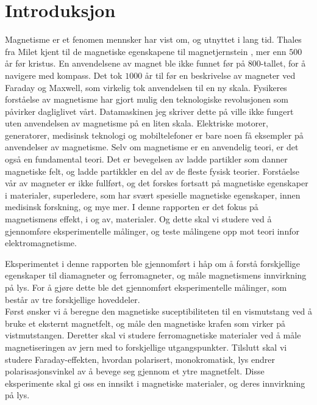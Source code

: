 \documentclass[%
 reprint,
 amsmath,amssymb,
 aps,
 norsk,
]{revtex4-1}
\begin{document}
\section{\label{sec:level1}Introduksjon}
Magnetisme er et fenomen mennsker har vist om, og utnyttet i lang tid. Thales fra Milet kjent til de magnetiske egenskapene til magnetjernstein \cite{holtebekk_magnetisme_2017}, mer enn $500$ år før kristus. En anvendelsene av magnet ble ikke funnet før på $800$-tallet, for å navigere med kompass. Det tok  $1000$ år til før en beskrivelse av magneter ved Faraday og Maxwell, som virkelig tok anvendelsen til en ny skala. Fysikeres forståelse av magnetisme har gjort mulig den teknologiske revolusjonen som påvirker dagliglivet vårt. Datamaskinen jeg skriver dette på ville ikke fungert uten anvendelsen av magnetisme på en liten skala. Elektriske motorer, generatorer, medisinsk teknologi og mobiltelefoner er bare noen få eksempler på anvendelser av magnetisme. Selv om magnetisme er en anvendelig teori, er det også en fundamental teori. Det er bevegelsen av ladde partikler som danner magnetiske felt, og ladde partikkler en del av de fleste fysisk teorier. Forståelse vår av magneter er ikke fullført, og det forskes fortsatt på magnetiske egenskaper i materialer, superledere, som har svært spesielle magnetiske egenskaper, innen medisinsk forskning, og mye mer.
I denne rapporten er det fokus på magnetismens effekt, i og av, materialer. Og dette skal vi studere ved å gjennomføre eksperimentelle målinger, og teste målingene opp mot teori innfor elektromagnetisme.\par
Eksperimentet i denne rapporten ble gjennomført i håp om å forstå forskjellige egenskaper til diamagneter og ferromagneter, og måle magnetismens innvirkning på lys. For å gjøre dette ble det gjennomført eksperimentelle målinger, som består av tre forskjellige hoveddeler.\\
Først ønsker vi å beregne den magnetiske suceptibiliteten til en vismutstang ved å bruke et eksternt magnetfelt, og måle den magnetiske krafen som virker på vistmutstangen. Deretter skal vi studere ferromagnetiske materialer ved å måle magnetiseringen av jern med to forskjellige utgangspunkter. Tilslutt skal vi studere Faraday-effekten, hvordan polarisert, monokromatisk, lys endrer polarisasjonsvinkel av å bevege seg gjennom et ytre magnetfelt. Disse eksperimente skal gi oss en innsikt i magnetiske materialer, og deres innvirkning på lys.
\end{document}
